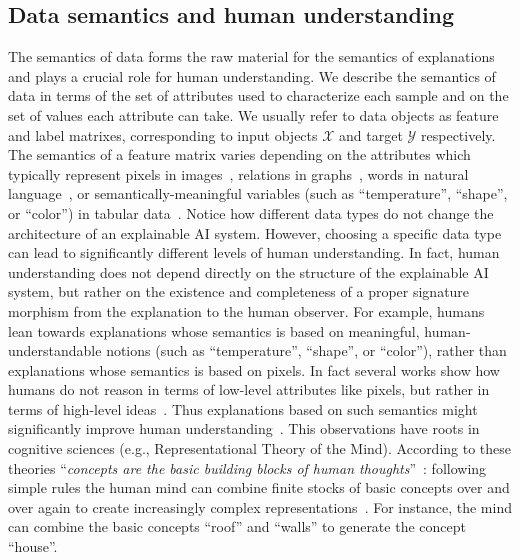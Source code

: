 \subsection{Data semantics and human understanding}
The semantics of data forms the raw material for the semantics of explanations and plays a crucial role for human understanding. We describe the semantics of data in terms of the set of attributes used to characterize each sample and on the set of values each attribute can take. We usually refer to data objects as feature and label matrixes, corresponding to input objects $\mathcal{X}$ and target $\mathcal{Y}$ respectively. The semantics of a feature matrix varies depending on the attributes which typically represent pixels in images~\cite{kulkarni2022explainable}, relations in graphs~\cite{li2022survey}, words in natural language~\cite{danilevsky2020survey}, or semantically-meaningful variables (such as ``temperature'', ``shape'', or ``color'') in tabular data~\cite{di2022explainable}. Notice how different data types do not change the architecture of an explainable AI system. However, choosing a specific data type can lead to significantly different levels of human understanding. In fact, human understanding does not depend directly on the structure of the explainable AI system, but rather on the existence and completeness of a proper signature morphism from the explanation to the human observer. For example, humans lean towards explanations whose semantics is based on meaningful, human-understandable notions (such as ``temperature'', ``shape'', or ``color''), rather than explanations whose semantics is based on pixels.
In fact several works show how humans do not reason in terms of low-level attributes like pixels, but rather in terms of high-level ideas~\cite{goguen2005concept,ghorbani2019interpretation}. Thus explanations based on such semantics might significantly improve human understanding~\cite{ghorbani2019interpretation}.
This observations have roots in cognitive sciences (e.g., Representational Theory of the Mind). According to these theories ``\emph{concepts are the basic building blocks of human thoughts}''~\citep{margolis2007ontology}: following simple rules the human mind can combine finite stocks of basic concepts over and over again to create increasingly complex representations~\citep{margolis2007ontology}. For instance, the mind can combine the basic concepts ``roof'' and ``walls'' to generate the concept ``house''. 

